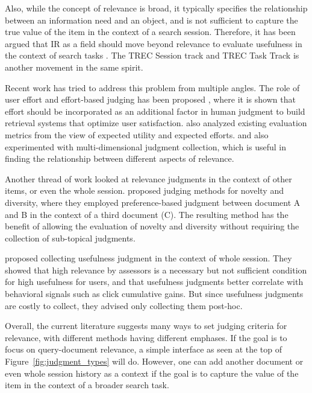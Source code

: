 Also, while the concept of relevance is broad, it typically specifies the relationship between an information need and an object, and is not sufficient to capture the true value of the item in the context of a search session. Therefore, it has been argued that IR as a field should move beyond relevance to evaluate usefulness in the context of search tasks \citep{Belkin:2015:SAL}. The TREC Session track \citep{carterette2014overview} and TREC Task Track \cite{yilmaz2015overview} is another movement in the same spirit.



Recent work has tried to address this problem from multiple angles. The role of user effort and effort-based judging has been proposed \citep{Yilmaz:2014,VermaYC16}, where it is shown that effort should be incorporated as an additional factor in human judgment to build retrieval systems that optimize user satisfaction. \cite{Carterette:2011:SEU} also analyzed existing evaluation metrics from the view of expected utility and expected efforts. \cite{Golbus:2014:CDR} and \cite{Kim:2013} also experimented with multi-dimensional judgment collection, which is useful in finding the relationship between different aspects of relevance. 

Another thread of work looked at relevance judgments in the context of other items, or even the whole session. \cite{Chandar2013} proposed judging methods for novelty and diversity, where they employed preference-based judgment between document A and B in the context of a third document (C). The resulting method has the benefit of allowing the evaluation of novelty and diversity without requiring the collection of sub-topical judgments. 

\cite{Mao:2016} proposed collecting usefulness judgment in the context of whole session. They showed that high relevance by assessors is a necessary but not sufficient condition for high usefulness for users, and that usefulness judgments better correlate with behavioral signals such as click cumulative gains. But since usefulness judgments are costly to collect, they advised only collecting them post-hoc.

Overall, the current literature suggests many ways to set judging criteria for relevance, with different methods having different emphases. If the goal is to focus on query-document relevance, a simple interface as seen at the top of Figure~\ref{fig:judgment_types} will do. However, one can add another document or even whole session history as a context if the goal is to capture the value of the item in the context of a broader search task. 

